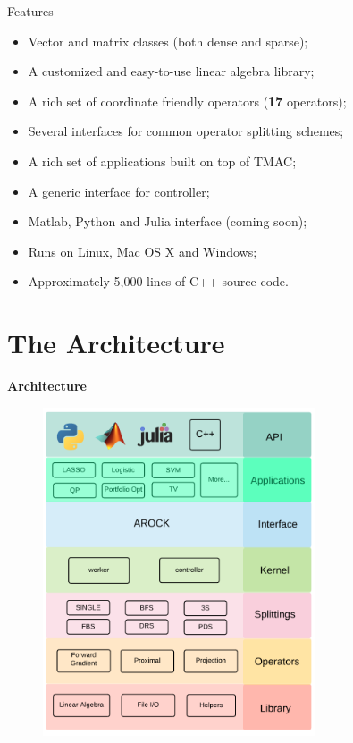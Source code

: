\documentclass[hyperref,handout,compress,9pt,mathserif]{beamer}
\begin{document}
\begin{frame}{Features}
\begin{itemize}
\item Vector and matrix classes (both dense and sparse);
\item A customized and easy-to-use linear algebra library; 
\item A rich set of coordinate friendly operators (\textbf{17} operators);
\item Several interfaces for common operator splitting schemes; 
\item A rich set of applications built on top of TMAC;
\item A generic interface for controller;
\item Matlab, Python and Julia interface (coming soon);
\item Runs on Linux, Mac OS X and Windows;
\item Approximately 5,000 lines of C++ source code.
\end{itemize}
\end{frame}

\section{The Architecture}
\begin{frame}\begin{center}\begin{Large}\textbf{Architecture}\end{Large}\end{center}\end{frame}

\begin{frame}
\begin{figure}[!h]
        \centering
                \includegraphics[width=0.72\textwidth]{./figs/architecture}
\end{figure}
\end{frame}
\end{document}
